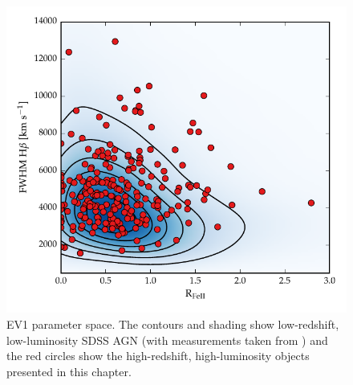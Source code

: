 \begin{figure}[t!]
\centering 
    \includegraphics[width=\columnwidth]{figures/chapter04/ev1_lowz.pdf} 
    \caption[{EV1 parameter space.}]{EV1 parameter space. The contours and shading show low-redshift, low-luminosity SDSS AGN (with measurements taken from \citealt{shen11}) and the red circles show the high-redshift, high-luminosity objects presented in this chapter.}      
    \label{fig:ev1_lowz}
\end{figure}

